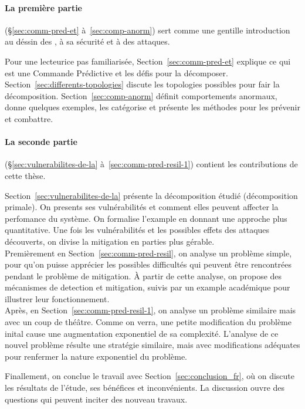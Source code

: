 \documentclass[../main.tex]{subfiles}
\begin{document}
\paragraph{La première partie} (\S\ref{sec:comm-pred-et} à~\ref{sec:comp-anorm}) sert comme une gentille introduction au déssin des \dmpc{}, à sa sécurité et à des attaques.
\newcommand{\tpc}{\textperiodcentered}

Pour un\tpc{}e lecteur\tpc{}ice pas familiarisé\tpc{}e, Section~\ref{sec:comm-pred-et} explique ce qui est une Commande Prédictive et les défis pour la décomposer.
Section~\ref{sec:differents-topologies} discute les topologies possibles pour fair la décomposition.
Section~\ref{sec:comp-anorm} définit comportements anormaux, donne quelques exemples, les catégorise et présente les méthodes pour les prévenir et combattre.

\paragraph{La seconde partie} (\S\ref{sec:vulnerabilites-de-la} à~\ref{sec:comm-pred-resil-1}) contient les contributions de cette thèse.

Section~\ref{sec:vulnerabilites-de-la} présente la décomposition étudié (décomposition primale). On presents ses vulnérabilités et comment elles peuvent affecter la perfomance du système.
On formalise l'example en donnant une approche plus quantitative.
Une fois les vulnérabilités et les possibles effets des attaques découverts, on divise la mitigation en parties plus gérable.
\\ Premièrement en Section~\ref{sec:comm-pred-resil}, on analyse un problème simple, pour qu'on puisse apprécier les possibles difficultés qui peuvent être rencontrées pendant le problème de mitigation.
À partir de cette analyse, on propose des mécanismes de detection et mitigation, suivis par un example académique pour illustrer leur fonctionnement.
\\Après, en Section~\ref{sec:comm-pred-resil-1}, on analyse un problème similaire mais avec un coup de théâtre. Comme on verra, une petite modification du problème inital cause une augmentation exponentiel de sa complexité.
L'analyse de ce nouvel problème résulte une stratégie similaire, mais avec modifications adéquates pour renfermer la nature exponentiel du problème.

Finallement, on conclue le travail avec Section~\ref{sec:conclusion_fr}, où on discute les résultats de l'étude, ses bénéfices et inconvénients.
La discussion ouvre des questions qui peuvent inciter des nouveau travaux.
\end{document}
